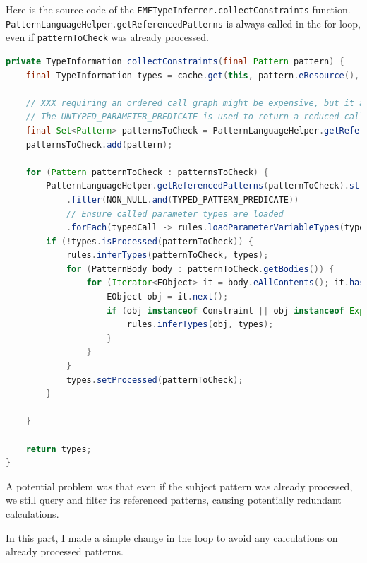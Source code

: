 \documentclass[11pt,a4paper,oneside]{report}
\begin{document}
Here is the source code of the \texttt{EMFTypeInferrer.collectConstraints}
function. \texttt{PatternLanguageHelper.getReferencedPatterns} is always called
in the for loop, even if \texttt{patternToCheck} was already processed.

\begin{lstlisting}[caption={Original source code of \texttt{collectConstraints}}, language=java]
private TypeInformation collectConstraints(final Pattern pattern) {
    final TypeInformation types = cache.get(this, pattern.eResource(), () -> new TypeInformation(typeSystem));

    // XXX requiring an ordered call graph might be expensive, but it avoids inconsistent errors during type inference
    // The UNTYPED_PARAMETER_PREDICATE is used to return a reduced call graph where pattern with only declared types are (transitively) ignored.
    final Set<Pattern> patternsToCheck = PatternLanguageHelper.getReferencedPatternsTransitive(pattern, true, NON_NULL.and(UNTYPED_PATTERN_PREDICATE));
    patternsToCheck.add(pattern);

    for (Pattern patternToCheck : patternsToCheck) {
        PatternLanguageHelper.getReferencedPatterns(patternToCheck).stream()
            .filter(NON_NULL.and(TYPED_PATTERN_PREDICATE))
            // Ensure called parameter types are loaded
            .forEach(typedCall -> rules.loadParameterVariableTypes(typedCall, types));
        if (!types.isProcessed(patternToCheck)) {
            rules.inferTypes(patternToCheck, types);
            for (PatternBody body : patternToCheck.getBodies()) {
                for (Iterator<EObject> it = body.eAllContents(); it.hasNext();) {
                    EObject obj = it.next();
                    if (obj instanceof Constraint || obj instanceof Expression) {
                        rules.inferTypes(obj, types);
                    }
                }
            }
            types.setProcessed(patternToCheck);
        }

    }

    return types;
}
\end{lstlisting}

A potential problem was that even if the subject pattern was already processed,
we still query and filter its referenced patterns, causing potentially redundant
calculations.

In this part, I made a simple change in the loop to avoid any calculations on
already processed patterns.
\end{document}
